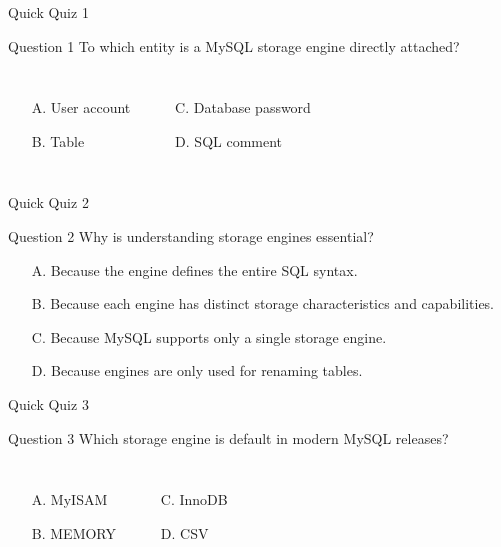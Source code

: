 \documentclass[aspectratio=169,11pt]{beamer}
\newcommand{\smallitem}{\setlength{\itemsep}{2pt}}
\begin{document}
\begin{frame}{Quick Quiz 1}
\begin{block}{Question 1}
To which entity is a MySQL storage engine directly attached?
\end{block}
\vspace{0.2cm}
\begin{columns}[T,onlytextwidth]
\begin{itemize}\smallitem
  \item[A.] User account
  \item[B.] Table
\end{itemize}
\begin{itemize}\smallitem
  \item[C.] Database password
  \item[D.] SQL comment
\end{itemize}
\end{columns}
\end{frame}

\begin{frame}{Quick Quiz 2}
\begin{block}{Question 2}
Why is understanding storage engines essential?
\end{block}
\vspace{0.2cm}
\begin{itemize}\smallitem
  \item[A.] Because the engine defines the entire SQL syntax.
  \item[B.] Because each engine has distinct storage characteristics and capabilities.
  \item[C.] Because MySQL supports only a single storage engine.
  \item[D.] Because engines are only used for renaming tables.
\end{itemize}
\end{frame}

\begin{frame}{Quick Quiz 3}
\begin{block}{Question 3}
Which storage engine is default in modern MySQL releases?
\end{block}
\vspace{0.2cm}
\begin{columns}[T,onlytextwidth]
\begin{itemize}\smallitem
  \item[A.] MyISAM
  \item[B.] MEMORY
\end{itemize}
\begin{itemize}\smallitem
  \item[C.] InnoDB
  \item[D.] CSV
\end{itemize}
\end{columns}
\end{frame}
\end{document}

